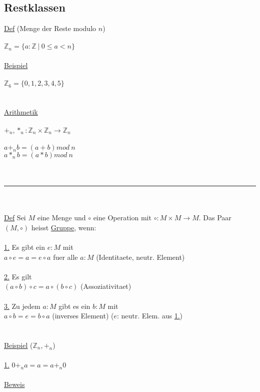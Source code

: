 \documentclass[18pt,a4paper]{article}
\newcommand{\tab}{\hspace*{2em}}
\begin{document}
\subsection{Restklassen}

\uline{Def} (Menge der Reste modulo $n$)\\
\\
$\mathbb{Z}_n = \{ a:\mathbb{Z}\:\vert\: 0\leqslant a<n\}$\\
\\
\uline{Beispiel}\\
\\
$\mathbb{Z}_6 = \{0,1,2,3,4,5\}$\\
\\
\\
\uline{Arithmetik}\\
\\
$+_n , *_n : \mathbb{Z}_n \times \mathbb{Z}_n \rightarrow \mathbb{Z}_n$\\
\\
$a +_n b = (a+b)mod\:n$\\
$a *_n b = (a*b)mod\:n$\\
\\
\\
\rule{\textwidth}{0.4mm}\\
\\
\uline{Def} Sei $M$ eine Menge und $\circ$ eine Operation mit $\circ : M \times M \rightarrow M$. Das Paar $(M,\circ)$ heisst \uline{Gruppe}, wenn:\\
\\
\uline{1.} Es gibt ein $e:M$ mit \\
\tab $a\circ e = a= e\circ a$ fuer alle $a:M$ (Identitaete, neutr. Element)\\
\\
\uline{2.} Es gilt\\
\tab $(a\circ b)\circ c = a\circ(b\circ c)$ (Assoziativitaet)\\
\\
\uline{3.} Zu jedem $a:M$ gibt es ein $b:M$ mit \\
\tab $a\circ b = e = b\circ a$ (inverses Element) \tab ($e$: neutr. Elem. aus \uline{1.})\\
\\
\\
\uline{Beispiel} ($\mathbb{Z}_n, +_n$)\\
\\
\uline{1.} $0 +_n a = a = a +_n 0$\\
\\
\uline{Beweis}\\
\end{document}
